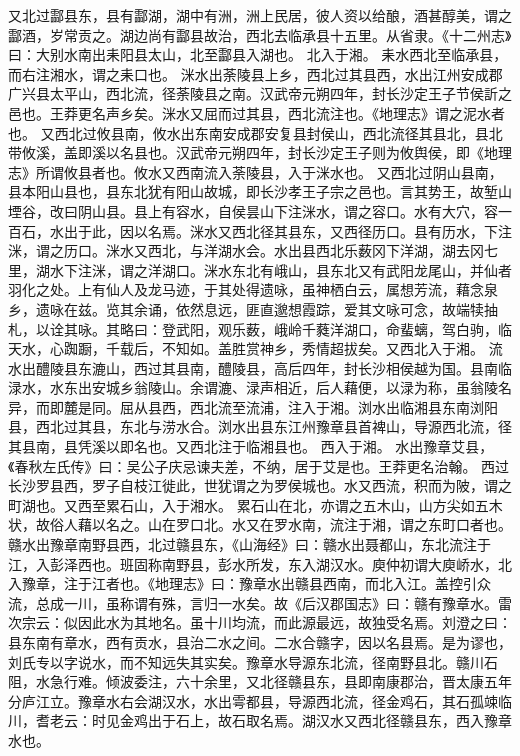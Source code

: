 \documentclass[12pt,UTF8]{ctexbook}
\begin{document}
又北过酃县东，县有酃湖，湖中有洲，洲上民居，彼人资以给酿，酒甚醇美，谓之酃酒，岁常贡之。湖边尚有酃县故治，西北去临承县十五里。从省隶。《十二州志》曰：大别水南出耒阳县太山，北至酃县入湖也。
北入于湘。
耒水西北至临承县，而右注湘水，谓之耒口也。
洣水出荼陵县上乡，西北过其县西，水出江州安成郡广兴县太平山，西北流，径荼陵县之南。汉武帝元朔四年，封长沙定王子节侯訢之邑也。王莽更名声乡矣。洣水又屈而过其县，西北流注也。《地理志》谓之泥水者也。
又西北过攸县南，攸水出东南安成郡安复县封侯山，西北流径其县北，县北带攸溪，盖即溪以名县也。汉武帝元朔四年，封长沙定王子则为攸舆侯，即《地理志》所谓攸县者也。攸水又西南流入荼陵县，入于洣水也。
又西北过阴山县南，县本阳山县也，县东北犹有阳山故城，即长沙孝王子宗之邑也。言其势王，故堑山堙谷，改曰阴山县。县上有容水，自侯昙山下注洣水，谓之容口。水有大穴，容一百石，水出于此，因以名焉。洣水又西北径其县东，又西径历口。县有历水，下注洣，谓之历口。洣水又西北，与洋湖水会。水出县西北乐薮冈下洋湖，湖去冈七里，湖水下注洣，谓之洋湖口。洣水东北有峨山，县东北又有武阳龙尾山，并仙者羽化之处。上有仙人及龙马迹，于其处得遗咏，虽神栖白云，属想芳流，藉念泉乡，遗咏在兹。览其余诵，依然息远，匪直邈想霞踪，爱其文咏可念，故端犊抽札，以诠其咏。其略曰：登武阳，观乐薮，峨岭千蕤洋湖口，命蜚螭，驾白驹，临天水，心踟蹰，千载后，不知如。盖胜赏神乡，秀情超拔矣。又西北入于湘。
流水出醴陵县东漉山，西过其县南，醴陵县，高后四年，封长沙相侯越为国。县南临渌水，水东出安城乡翁陵山。余谓漉、渌声相近，后人藉便，以渌为称，虽翁陵名异，而即麓是同。屈从县西，西北流至流浦，注入于湘。浏水出临湘县东南浏阳县，西北过其县，东北与涝水合。浏水出县东江州豫章县首裨山，导源西北流，径其县南，县凭溪以即名也。又西北注于临湘县也。
西入于湘。
水出豫章艾县，《春秋左氏传》曰：吴公子庆忌谏夫差，不纳，居于艾是也。王莽更名治翰。
西过长沙罗县西，罗子自枝江徙此，世犹谓之为罗侯城也。水又西流，积而为陂，谓之町湖也。又西至累石山，入于湘水。
累石山在北，亦谓之五木山，山方尖如五木状，故俗人藉以名之。山在罗口北。水又在罗水南，流注于湘，谓之东町口者也。
赣水出豫章南野县西，北过赣县东，《山海经》曰：赣水出聂都山，东北流注于江，入彭泽西也。班固称南野县，彭水所发，东入湖汉水。庾仲初谓大庾峤水，北入豫章，注于江者也。《地理志》曰：豫章水出赣县西南，而北入江。盖控引众流，总成一川，虽称谓有殊，言归一水矣。故《后汉郡国志》曰：赣有豫章水。雷次宗云：似因此水为其地名。虽十川均流，而此源最远，故独受名焉。刘澄之曰：县东南有章水，西有贡水，县治二水之间。二水合赣字，因以名县焉。是为谬也，刘氏专以字说水，而不知远失其实矣。豫章水导源东北流，径南野县北。赣川石阻，水急行难。倾波委注，六十余里，又北径赣县东，县即南康郡治，晋太康五年分庐江立。豫章水右会湖汉水，水出雩都县，导源西北流，径金鸡石，其石孤竦临川，耆老云：时见金鸡出于石上，故石取名焉。湖汉水又西北径赣县东，西入豫章水也。
\end{document}
